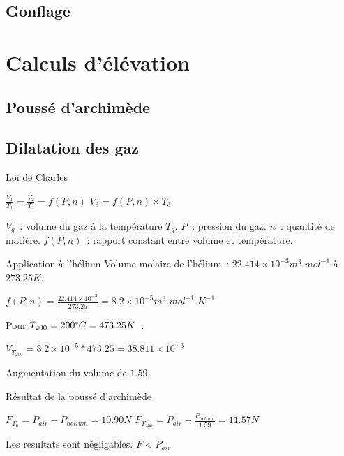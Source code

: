 \documentclass{beamer}
\begin{document}
\subsection{Gonflage}

\section{Calculs d'élévation}

\subsection{Poussé d'archimède}
\subsection{Dilatation des gaz}

\begin{frame}{Loi de Charles}
  \begin{center}
    $\frac{V_1}{T_1} = \frac{V_2}{T_2} = f(P, n)$
    \bigbreak
    $V_3 = f(P, n) \times T_3$
  \end{center}
  \bigbreak
  $V_q$~: volume du gaz à la température $T_q$. $P$~: pression du gaz. $n$~: quantité de matière. $f(P, n)$~: rapport constant entre volume et température.
\end{frame}

\begin{frame}{Application à l'hélium}
  Volume molaire de l'hélium~: $22.414\times 10^{-3} m^3.mol^{-1}$ à $273.25K$.
  \medbreak
  \begin{center}
    $f(P, n) = \frac{22.414\times 10^{-3}}{273.25} = 8.2\times 10^{-5} m^3.mol^{-1}.K^{-1}$
    \bigbreak
  \end{center}
  Pour $T_{200} = 200 \degree C = 473.25 K$~:
  \begin{center}
    \medbreak
    $V_{T_{200}} = 8.2\times 10^{-5} * 473.25 = 38.811 \times 10^{-3}$
  \end{center}
  Augmentation du volume de $1.59$.
\end{frame}

\begin{frame}{Résultat de la poussé d'archimède}
  \begin{center}
    $F_{T_0} = P_{air} - P_{helium} = 10.90 N$
    \bigbreak
    $F_{T_{200}} = P_{air} - \frac{P_{helium}}{1.59} = 11.57 N$ \\
  \end{center}
  Les resultats sont négligables. $F < P_{air}$
\end{frame}
\end{document}
